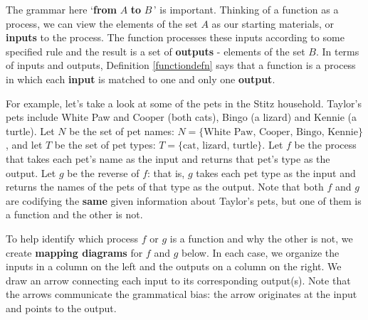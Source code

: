 \documentclass{ximera}
\begin{document}
\medskip

The grammar here `\textbf{from} $A$ \textbf{to} $B\,$'  is important.  Thinking of a function as a process, we can view the elements of the set $A$ as our starting materials, or \textbf{inputs} to the process.  The function  processes these inputs according to some specified rule and the result is a set of  \textbf{outputs}  - elements of the set $B$. In terms of inputs and outputs, Definition \ref{functiondefn}  says that a function is a process in which each \textbf{input} is matched to one and only one \textbf{output}.

\medskip

For example, let's take a look at some of the pets in the Stitz household.  Taylor's pets include White Paw and Cooper (both cats), Bingo (a lizard) and Kennie (a turtle).  Let $N$ be the set of pet names: $N = \{ \text{White Paw, Cooper, Bingo, Kennie} \}$, and let $T$ be the set of pet types:  $T = \{ \text{cat, lizard, turtle} \}$.   Let $f$ be the process that takes each pet's name as the input and returns that pet's type as the output. Let $g$ be the reverse of $f$:  that is, $g$ takes each pet type as the input and returns the names of the pets of that type as the output.   Note that both $f$ and $g$ are codifying the \textbf{same} given information about Taylor's pets,  but one of them is a function and the other is not.  

\medskip

To help identify which process $f$ or $g$ is a function and  why the other is not, we create   \textbf{mapping diagrams} for $f$ and $g$ below.  In each case, we organize the inputs in a column on the left and the outputs on a column on the right.  We draw an arrow connecting each input to its corresponding output(s).  Note that the arrows communicate the grammatical bias: the arrow originates at the input and points to the output.

\medskip
\end{document}
